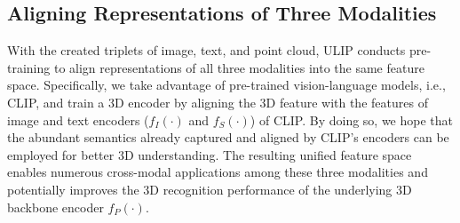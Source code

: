 \documentclass[10pt,twocolumn,letterpaper]{article}
\begin{document}
\subsection{Aligning Representations of Three Modalities}
\label{sec:align representation}
With the created triplets of image, text, and point cloud, ULIP conducts pre-training to align representations of all three modalities into the same feature space.
Specifically, we take advantage of pre-trained vision-language models, i.e., CLIP, and train a 3D encoder by aligning the 3D feature with the features of image and text encoders ($f_I(\cdot)$ and  $f_S(\cdot)$) of CLIP.
By doing so, we hope that the abundant semantics already captured and aligned by CLIP's encoders can be employed for better 3D understanding.
The resulting unified feature space enables numerous cross-modal applications among these three modalities and potentially improves the 3D recognition performance of the underlying 3D backbone encoder $f_P(\cdot)$.


\end{document}
